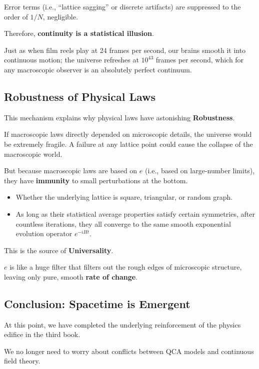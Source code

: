 \documentclass[11pt,a4paper,twoside]{book}
\begin{document}
Error terms (i.e., ``lattice sagging'' or discrete artifacts) are suppressed to the order of $1/N$, negligible.

Therefore, \textbf{continuity is a statistical illusion}.

Just as when film reels play at 24 frames per second, our brains smooth it into continuous motion; the universe refreshes at $10^{43}$ frames per second, which for any macroscopic observer is an absolutely perfect continuum.

\subsection{Robustness of Physical Laws}

This mechanism explains why physical laws have astonishing \textbf{Robustness}.

If macroscopic laws directly depended on microscopic details, the universe would be extremely fragile. A failure at any lattice point could cause the collapse of the macroscopic world.

But because macroscopic laws are based on $e$ (i.e., based on large-number limits), they have \textbf{immunity} to small perturbations at the bottom.

\begin{itemize}
\item Whether the underlying lattice is square, triangular, or random graph.

\item As long as their statistical average properties satisfy certain symmetries, after countless iterations, they all converge to the same smooth exponential evolution operator $e^{-iHt}$.
\end{itemize}

This is the source of \textbf{Universality}.

$e$ is like a huge filter that filters out the rough edges of microscopic structure, leaving only pure, smooth \textbf{rate of change}.

\subsection{Conclusion: Spacetime is Emergent}

At this point, we have completed the underlying reinforcement of the physics edifice in the third book.

We no longer need to worry about conflicts between QCA models and continuous field theory.
\end{document}
